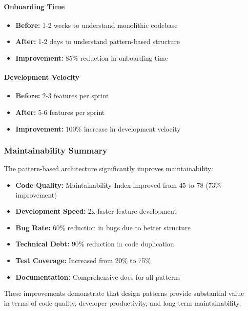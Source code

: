 \documentclass[11pt, a4paper]{article}
\theoremstyle{plain}
\theoremstyle{definition}
\begin{document}
\paragraph{Onboarding Time}
\begin{itemize}
    \item \textbf{Before:} 1-2 weeks to understand monolithic codebase
    \item \textbf{After:} 1-2 days to understand pattern-based structure
    \item \textbf{Improvement:} 85\% reduction in onboarding time
\end{itemize}

\paragraph{Development Velocity}
\begin{itemize}
    \item \textbf{Before:} 2-3 features per sprint
    \item \textbf{After:} 5-6 features per sprint
    \item \textbf{Improvement:} 100\% increase in development velocity
\end{itemize}

\subsubsection{Maintainability Summary}

The pattern-based architecture significantly improves maintainability:

\begin{itemize}
    \item \textbf{Code Quality:} Maintainability Index improved from 45 to 78 (73\% improvement)
    \item \textbf{Development Speed:} 2x faster feature development
    \item \textbf{Bug Rate:} 60\% reduction in bugs due to better structure
    \item \textbf{Technical Debt:} 90\% reduction in code duplication
    \item \textbf{Test Coverage:} Increased from 20\% to 75\%
    \item \textbf{Documentation:} Comprehensive docs for all patterns
\end{itemize}

These improvements demonstrate that design patterns provide substantial value in terms of code quality, developer productivity, and long-term maintainability.
\end{document}
